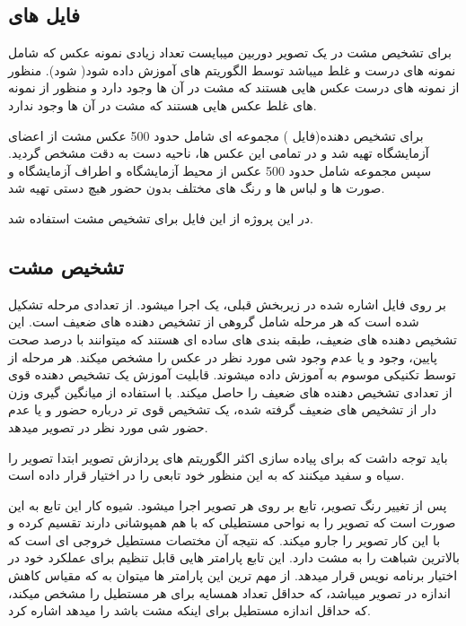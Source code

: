 \documentclass[oneside]{article}
\begin{document}
\subsection{فایل های 
}
برای تشخیص مشت در یک تصویر دوربین میبایست تعداد زیادی نمونه عکس که شامل نمونه های درست و غلط میباشد توسط الگوریتم های 
آموزش داده شود(
شود).
منظور از نمونه های درست عکس هایی هستند که مشت در آن ها وجود دارد و منظور از نمونه های غلط عکس هایی هستند که مشت در آن ها وجود ندارد.

برای 
تشخیص دهنده(فایل
) مجموعه ای شامل حدود 500 عکس مشت از اعضای آزمایشگاه تهیه شد و در تمامی این عکس ها، ناحیه دست به دقت مشخص گردید.  سپس مجموعه شامل حدود 500 عکس از محیط آزمایشگاه و اطراف آزمایشگاه و صورت ها و لباس ها و رنگ های مختلف بدون حضور هیچ دستی تهیه شد.

در این پروژه از این فایل برای تشخیص مشت استفاده شد. 
\subsection{تشخیص مشت}
بر روی فایل 
اشاره شده در زیربخش قبلی، یک 
اجرا میشود. 
از تعدادی مرحله تشکیل شده است که هر مرحله شامل گروهی از تشخیص دهنده های ضعیف است. این تشخیص دهنده های ضعیف، طبقه بندی های ساده ای هستند که میتوانند با درصد صحت پایین، وجود و یا عدم وجود شی مورد نظر در عکس را مشخص میکند. هر مرحله از 
توسط تکنیکی موسوم به
آموزش داده میشوند.
 قابلیت آموزش یک تشخیص دهنده قوی از تعدادی تشخیص دهنده های ضعیف را حاصل میکند.
با استفاده از میانگین گیری وزن دار از تشخیص های ضعیف گرفته شده، یک تشخیص قوی تر درباره حضور و یا عدم حضور شی مورد نظر در تصویر میدهد. 

باید توجه داشت که برای پیاده سازی اکثر الگوریتم های پردازش تصویر ابتدا تصویر را سیاه و سفید میکنند که به این منظور 
خود تابعی را در اختیار قرار داده است. 

پس از تغییر رنگ تصویر، تابع 
بر روی هر 
تصویر اجرا میشود. شیوه کار این تابع به این صورت است که تصویر را به نواحی مستطیلی که با هم همپوشانی دارند تقسیم کرده و با این کار تصویر را جارو میکند. که نتیجه آن مختصات مستطیل خروجی ای است که بالاترین شباهت را به مشت دارد. این تابع پارامتر هایی قابل تنظیم برای عملکرد خود در اختیار برنامه نویس قرار میدهد. از مهم ترین این پارامتر ها میتوان به 
که مقیاس کاهش اندازه در تصویر میباشد،
که حداقل تعداد همسایه برای هر مستطیل را مشخص میکند،
که حداقل اندازه مستطیل برای اینکه مشت باشد را میدهد اشاره کرد.
\end{document}
